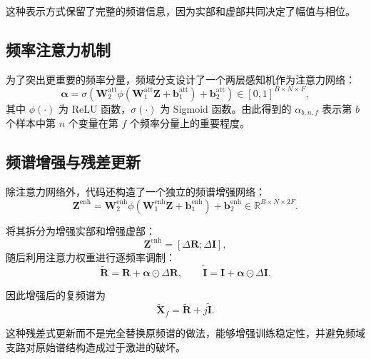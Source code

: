 这种表示方式保留了完整的频谱信息，因为实部和虚部共同决定了幅值与相位。

\subsection{频率注意力机制}

为了突出更重要的频率分量，频域分支设计了一个两层感知机作为注意力网络：
\begin{equation}
    \boldsymbol{\alpha}
    = \sigma\!\left(
        \mathbf{W}^{\mathrm{att}}_2
        \phi(\mathbf{W}^{\mathrm{att}}_1\mathbf{Z} + \mathbf{b}^{\mathrm{att}}_1)
        + \mathbf{b}^{\mathrm{att}}_2
    \right)
    \in [0,1]^{B \times N \times F},
\end{equation}
其中 $\phi(\cdot)$ 为 ReLU 函数，$\sigma(\cdot)$ 为 Sigmoid 函数。由此得到的 $\alpha_{b,n,f}$ 表示第 $b$ 个样本中第 $n$ 个变量在第 $f$ 个频率分量上的重要程度。

\subsection{频谱增强与残差更新}

除注意力网络外，代码还构造了一个独立的频谱增强网络：
\begin{equation}
    \mathbf{Z}^{\mathrm{enh}}
    =
    \mathbf{W}^{\mathrm{enh}}_2
    \phi(\mathbf{W}^{\mathrm{enh}}_1\mathbf{Z} + \mathbf{b}^{\mathrm{enh}}_1)
    + \mathbf{b}^{\mathrm{enh}}_2
    \in \mathbb{R}^{B \times N \times 2F}.
\end{equation}

将其拆分为增强实部和增强虚部：
\begin{equation}
    \mathbf{Z}^{\mathrm{enh}} = [\Delta \mathbf{R}; \Delta \mathbf{I}],
\end{equation}
随后利用注意力权重进行逐频率调制：
\begin{equation}
    \tilde{\mathbf{R}} = \mathbf{R} + \boldsymbol{\alpha} \odot \Delta \mathbf{R},
    \qquad
    \tilde{\mathbf{I}} = \mathbf{I} + \boldsymbol{\alpha} \odot \Delta \mathbf{I}.
\end{equation}

因此增强后的复频谱为
\begin{equation}
    \tilde{\mathbf{X}}_f = \tilde{\mathbf{R}} + j\tilde{\mathbf{I}}.
\end{equation}

这种残差式更新而不是完全替换原频谱的做法，能够增强训练稳定性，并避免频域支路对原始谱结构造成过于激进的破坏。

